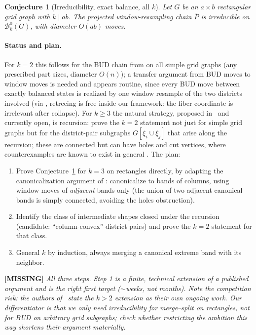 \documentclass[11pt]{article}
\newcommand{\missing}[1]{\medskip\noindent\textcolor{misscol}{\textbf{[MISSING]} \emph{#1}}\medskip}
\newcommand{\Bcal}{\mathcal{B}}
\newtheorem{conjecture}[theorem]{Conjecture}
\begin{document}
\begin{conjecture}[Irreducibility, exact balance, all $k$]
\label{conj:irred}
Let $G$ be an $a \times b$ rectangular grid graph with $k \mid ab$. The
projected window-resampling chain $\bar P$ is irreducible on
$\Bcal_k^0(G)$, with diameter $O(ab)$ moves.
\end{conjecture}

\paragraph{Status and plan.} For $k = 2$ this follows for the BUD chain
from \cite[Thm.~B.2]{akitaya2026bud} on all simple grid graphs (any
prescribed part sizes, diameter $O(n)$); a transfer argument from BUD moves
to window moves is needed and appears routine, since every BUD move
between exactly balanced states is realized by one window resample of the
two districts involved (via \cite[Lemma~A.3]{akitaya2026bud}, retreeing is free
inside our framework: the fiber coordinate is irrelevant after collapse).
For $k \ge 3$ the natural strategy, proposed in~\cite{akitaya2026bud} and
currently open, is recursion: prove the $k = 2$ statement not just for
simple grid graphs but for the district-pair subgraphs
$G[\xi_i \cup \xi_j]$ that arise along the recursion; these are connected
but can have holes and cut vertices, where counterexamples are known to
exist in general \cite[Lemma~B.14]{akitaya2026bud}. The plan:
\begin{enumerate}[1.]
  \item Prove Conjecture~\ref{conj:irred} for $k = 3$ on rectangles
    directly, by adapting the canonicalization argument of
    \cite[App.~B]{akitaya2026bud}: canonicalize to bands of columns, using
    window moves of \emph{adjacent} bands only (the union of two adjacent
    canonical bands is simply connected, avoiding the holes obstruction).
  \item Identify the class of intermediate shapes closed under the
    recursion (candidate: ``column-convex'' district pairs) and prove the
    $k = 2$ statement for that class.
  \item General $k$ by induction, always merging a canonical extreme band
    with its neighbor.
\end{enumerate}

\missing{All three steps. Step 1 is a finite, technical extension of a
published argument and is the right first target ($\sim$weeks, not months).
Note the competition risk: the authors of~\cite{akitaya2026bud} state the
$k > 2$ extension as their own ongoing work. Our differentiator is that we
only need irreducibility for \emph{merge--split on rectangles}, not for BUD
on arbitrary grid subgraphs; check whether restricting the ambition this way
shortens their argument materially.}
\end{document}
